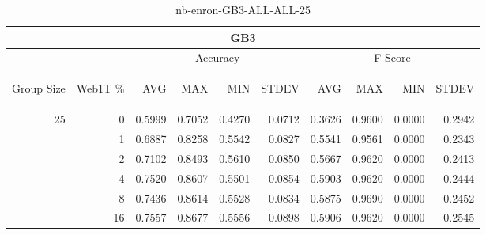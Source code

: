 \begin{center}
\begin{table}[htbp]
\begin{tabular}{ | r | r | r | r | r | r | r | r | r | r |}
\hline
\multicolumn{10}{|c|}{GB3}\\
\hline
 & & \multicolumn{4}{|c|}{Accuracy} & \multicolumn{4}{|c|}{F-Score}\\ \cline{3-10}
\begin{sideways}Group Size\end{sideways} & \begin{sideways}Web1T \%\end{sideways} & \begin{sideways}AVG\end{sideways} & \begin{sideways}MAX\end{sideways} & \begin{sideways}MIN\end{sideways} & \begin{sideways}STDEV\end{sideways} & \begin{sideways}AVG\end{sideways} & \begin{sideways}MAX\end{sideways} & \begin{sideways}MIN\end{sideways} & \begin{sideways}STDEV\end{sideways}\\
\hline
\multirow{5}{*}{25}
 & 0 & 0.5999 & 0.7052 & 0.4270 & 0.0712 & 0.3626 & 0.9600 & 0.0000 & 0.2942\\ \cline{2-10}
 & 1 & 0.6887 & 0.8258 & 0.5542 & 0.0827 & 0.5541 & 0.9561 & 0.0000 & 0.2343\\ \cline{2-10}
 & 2 & 0.7102 & 0.8493 & 0.5610 & 0.0850 & 0.5667 & 0.9620 & 0.0000 & 0.2413\\ \cline{2-10}
 & 4 & 0.7520 & 0.8607 & 0.5501 & 0.0854 & 0.5903 & 0.9620 & 0.0000 & 0.2444\\ \cline{2-10}
 & 8 & 0.7436 & 0.8614 & 0.5528 & 0.0834 & 0.5875 & 0.9690 & 0.0000 & 0.2452\\ \cline{2-10}
 & 16 & 0.7557 & 0.8677 & 0.5556 & 0.0898 & 0.5906 & 0.9620 & 0.0000 & 0.2545\\ \cline{2-10}
\hline
\end{tabular}
\caption{nb-enron-GB3-ALL-ALL-25}
\label{table:nb-enron-GB3-ALL-ALL-25}
\end{table}
\end{center}


